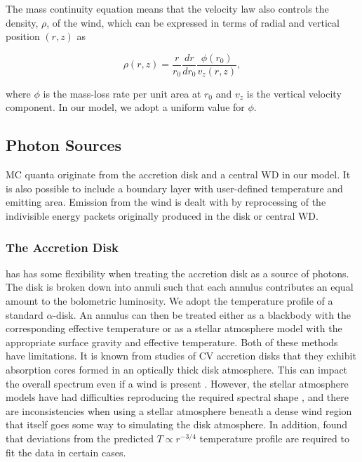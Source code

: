 \documentclass[preprint, a4paper, 11pt]{aastex}
\begin{document}
The mass continuity equation means that the velocity law also 
controls the density, $\rho$, of the wind, which can be expressed in terms
of radial and vertical position $(r,z)$ as 

\begin{equation}
\rho(r,z) = \frac{r}{r_0} \frac{dr}{dr_0} \frac{\phi(r_0)}{v_z(r,z)},
\label{density}
\end{equation}

where $\phi$ is the mass-loss rate per unit area at $r_0$
and $v_z$ is the vertical velocity component. In our model, we
adopt a uniform value for $\phi$. 



\subsection{Photon Sources}

MC quanta originate from the accretion disk and a central WD in our model. It is also possible to include
a boundary layer with user-defined temperature and emitting area. Emission from the wind is dealt with
by reprocessing of the indivisible energy packets originally produced in the disk or central WD.

\subsubsection{The Accretion Disk}

\py has has some flexibility when treating the accretion disk as a source of photons. 
The disk is broken down into annuli 
such that each annulus contributes an equal amount to the bolometric luminosity. 
We adopt the temperature profile of a standard \cite{shakurasunyaev1973} $\alpha$-disk.
An annulus can then
be treated either as a blackbody with the corresponding effective temperature or as a stellar atmosphere model
with the appropriate surface gravity and effective temperature. 
Both of these methods have limitations. It is known
from studies of CV accretion disks that they exhibit absorption cores 
formed in an optically thick disk atmosphere.
This can impact the overall spectrum even if a wind is present 
\citep[see e.g.][]{dhillon1996}.
However, the stellar atmosphere models
have had difficulties reproducing the required spectral shape \citep{wade1988}, 
and there are inconsistencies when using a 
stellar atmosphere beneath a dense
wind region that itself goes some way to simulating the disk atmosphere. 
In addition, \cite{linnell2010} found that deviations from the predicted 
$T\propto r^{-3/4}$ temperature profile are required to fit the data
in certain cases. 
\end{document}
